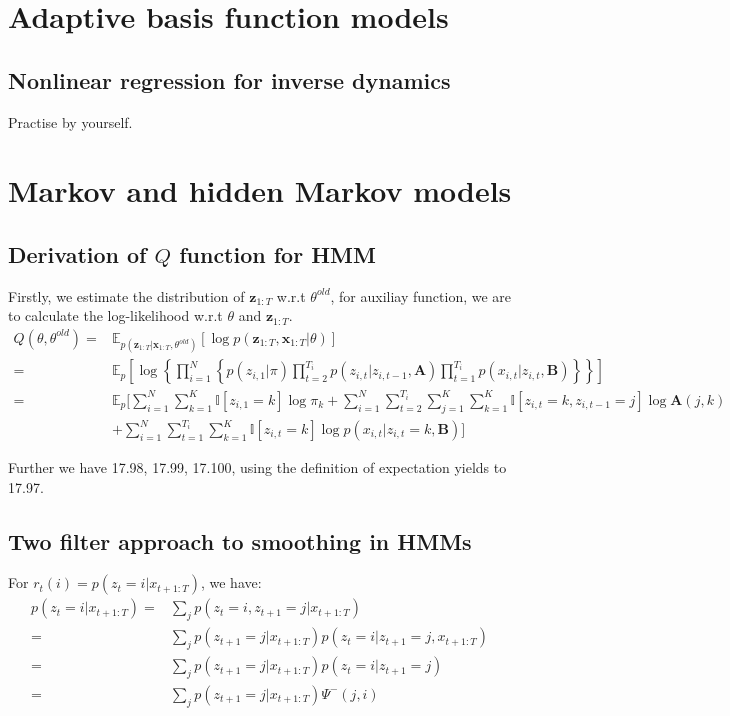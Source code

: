 \documentclass[UTF8]{ctexart}
\begin{document}
\newpage
\section{Adaptive basis function models}
\subsection{Nonlinear regression for inverse dynamics}
Practise by yourself.

\newpage
\section{Markov and hidden Markov models}
\subsection{Derivation of $Q$ function for HMM}
Firstly, we estimate the distribution of $\textbf{z}_{1:T}$ w.r.t $\theta^{old}$, for auxiliay function, we are to calculate the log-likelihood w.r.t $\theta$ and $\textbf{z}_{1:T}$. 
\begin{align}
Q(\theta,\theta^{old})=&\mathbb{E}_{p(\textbf{z}_{1:T}|\textbf{x}_{1:T},\theta^{old})}[\log p(\textbf{z}_{1:T},\textbf{x}_{1:T}|\theta)] \nonumber \\
=&\mathbb{E}_{p}[\log \left\{ \prod_{i=1}^{N} \left\{p(z_{i,1}|\pi)\prod_{t=2}^{T_{i}}p(z_{i,t}|z_{i,t-1},\textbf{A})\prod_{t=1}^{T_{i}}p(x_{i,t}|z_{i,t},\textbf{B})\right\}\right\}] \nonumber \\
=&\mathbb{E}_{p}[\sum_{i=1}^{N}\sum_{k=1}^{K}\mathbb{I}[z_{i,1}=k]\log \pi_{k}+\sum_{i=1}^{N}\sum_{t=2}^{T_{i}}\sum_{j=1}^{K}\sum_{k=1}^{K}\mathbb{I}[z_{i,t}=k,z_{i,t-1}=j]\log \textbf{A}(j,k)\nonumber \\
\ &+\sum_{i=1}^{N}\sum_{t=1}^{T_{i}}\sum_{k=1}^{K}\mathbb{I}[z_{i,t}=k]\log p(x_{i,t}|z_{i,t}=k,\textbf{B}) ] \nonumber 
\end{align}

Further we have 17.98, 17.99, 17.100, using the definition of expectation yields to 17.97.

\subsection{Two filter approach to smoothing in HMMs}
For $r_{t}(i)=p(z_{t}=i|x_{t+1:T})$, we have:
\begin{align}
p(z_{t}=i|x_{t+1:T})=&\sum_{j}p(z_{t}=i,z_{t+1}=j|x_{t+1:T}) \nonumber \\
=&\sum_{j}p(z_{t+1}=j|x_{t+1:T})p(z_{t}=i|z_{t+1}=j,x_{t+1:T}) \nonumber \\
=&\sum_{j}p(z_{t+1}=j|x_{t+1:T})p(z_{t}=i|z_{t+1}=j) \nonumber \\
=&\sum_{j}p(z_{t+1}=j|x_{t+1:T})\Psi^{-}(j,i) \nonumber
\end{align}
\end{document}
